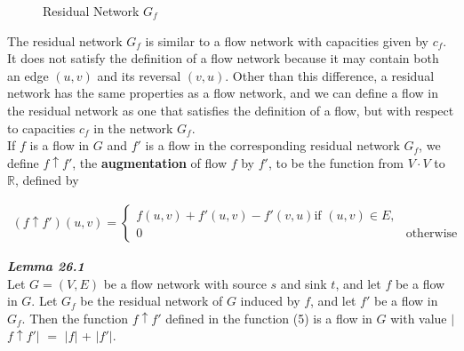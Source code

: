 \documentclass[12pt]{article}
\begin{document}
\begin{figure}[H]
\centering
{} 
\caption{\footnotesize{Residual Network $G_f$}}
\end{figure}

The residual network $G_f$ is similar to a flow network with capacities given by $c_f$. It does not satisfy the definition of a flow network because it may contain both an edge $(u, v)$ and its reversal $(v, u)$. Other than this difference, a residual network has the same properties as a flow network, and we can define a flow in the residual network as one that satisfies the definition of a flow, but with respect to capacities $c_f$ in the network $G_f$.\\

If $f$ is a flow in $G$ and $f'$ is a flow in the corresponding residual network $G_f$, we define $f \uparrow f'$, the \textbf{augmentation} of flow $f$ by $f'$, to be the function from $V \cdot V$ to $\mathbb{R}$, defined by

\begin{align}
 (f \uparrow f')(u, v) =
  \begin{cases}
  	f(u, v) + f'(u, v) - f'(v, u) \text{if } (u,v) \in E, \\
  	0 & \text{otherwise}
  \end{cases}
\end{align}

\newpage
\textbf{\textit{Lemma 26.1}}\\
Let $G = (V, E)$ be a flow network with source $s$ and sink $t$, and let $f$ be a flow in $G$. Let $G_f$ be the residual network of $G$ induced by $f$, and let $f'$ be a flow in $G_f$. Then the function $f \uparrow f'$ defined in the function (5) is a flow in $G$ with value $|$$f \uparrow f'$$|$ $=$ $|$$f$$|$ + $|$$f'$$|$.\\
\end{document}
